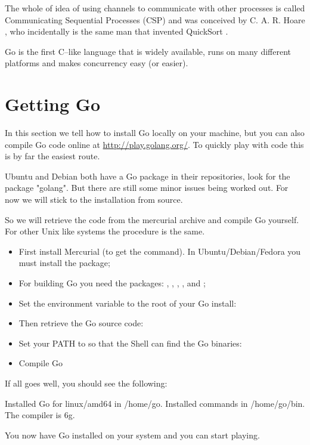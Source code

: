 The whole of idea of using channels to communicate with other processes
is called Communicating Sequential Processes (CSP) and was conceived
by C. A. R. Hoare \cite{hoare}, who incidentally is the same man that
invented QuickSort \cite{quicksort}.

\begin{lbar}[]
Go is the first C--like language that is widely available,
runs on many
different platforms and makes concurrency easy (or easier).
\end{lbar}


\section{Getting Go}
In this section we tell how to install Go locally on your machine, but you can
also compile Go code online at \url{http://play.golang.org/}. To quickly
play with code this is by far the easiest route.

Ubuntu and Debian both have a Go package in their repositories, look for
the package "golang". But there are still some minor issues being worked
out. For now we will stick to the installation from source.

So we will retrieve the code from the mercurial archive and compile
Go yourself. For other Unix like systems the procedure is the same.
\begin{itemize}
\item First install Mercurial (to get the  command). In
Ubuntu/Debian/Fedora you must install the  package;

\item For building Go you need the packages: ,
, , ,  and ;

\item Set the environment variable  to the root of your
Go install:
\begin{display}
\pr {}
\end{display}

\item Then retrieve the Go source code:
\begin{display}
\pr {}
\end{display}

\item Set your PATH to so that the Shell can find the Go binaries:
\begin{display}
\pr {}
\end{display}

\item Compile Go
\begin{display}
\pr {}
\pr {}
\end{display}
\end{itemize}
If all goes well, you should see the following:
\begin{display}
Installed Go for linux/amd64 in /home/go.
Installed commands in /home/go/bin.
The compiler is 6g.
\end{display}
You now have Go installed on your system and you can start playing.

